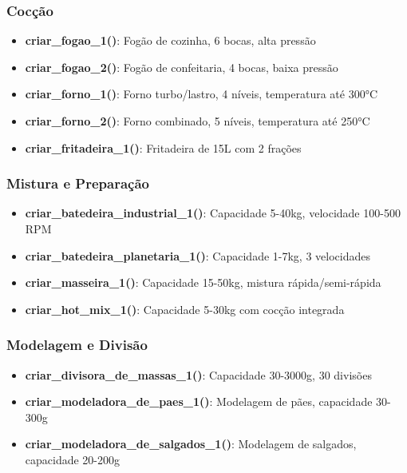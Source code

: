 \documentclass[11pt,a4paper]{article}
\begin{document}
\subsubsection{Cocção}

\begin{itemize}[leftmargin=2cm]
    \item \textbf{criar\_fogao\_1()}: Fogão de cozinha, 6 bocas, alta pressão
    \item \textbf{criar\_fogao\_2()}: Fogão de confeitaria, 4 bocas, baixa pressão
    \item \textbf{criar\_forno\_1()}: Forno turbo/lastro, 4 níveis, temperatura até 300°C
    \item \textbf{criar\_forno\_2()}: Forno combinado, 5 níveis, temperatura até 250°C
    \item \textbf{criar\_fritadeira\_1()}: Fritadeira de 15L com 2 frações
\end{itemize}

\subsubsection{Mistura e Preparação}

\begin{itemize}[leftmargin=2cm]
    \item \textbf{criar\_batedeira\_industrial\_1()}: Capacidade 5-40kg, velocidade 100-500 RPM
    \item \textbf{criar\_batedeira\_planetaria\_1()}: Capacidade 1-7kg, 3 velocidades
    \item \textbf{criar\_masseira\_1()}: Capacidade 15-50kg, mistura rápida/semi-rápida
    \item \textbf{criar\_hot\_mix\_1()}: Capacidade 5-30kg com cocção integrada
\end{itemize}

\subsubsection{Modelagem e Divisão}

\begin{itemize}[leftmargin=2cm]
    \item \textbf{criar\_divisora\_de\_massas\_1()}: Capacidade 30-3000g, 30 divisões
    \item \textbf{criar\_modeladora\_de\_paes\_1()}: Modelagem de pães, capacidade 30-300g
    \item \textbf{criar\_modeladora\_de\_salgados\_1()}: Modelagem de salgados, capacidade 20-200g
\end{itemize}
\end{document}
